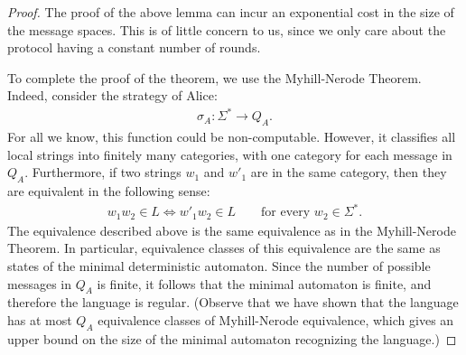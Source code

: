 \begin{proof}
The proof of the above lemma can incur an exponential cost in the size of the message spaces. This is of little concern to us, since we only care about the protocol having a constant number of rounds.

  To complete the proof of the theorem, we use the  Myhill-Nerode Theorem.  Indeed, consider the strategy of  Alice: 
  \begin{align*}
  \sigma_A : \Sigma^* \to Q_A.
  \end{align*}
  For all we know, this function could be non-computable. However, it classifies all local strings into finitely many categories, with one category for each message in $Q_A$. Furthermore, if two strings $w_1$ and $w'_1$ are in the same category, then they are equivalent in the following sense: 
  \begin{align}\label{eq:myhill-nerode-equivalence}
  w_1 w_2 \in L \Leftrightarrow w'_1 w_2 \in L 
  \qquad \text{for every $w_2 \in \Sigma^*$.}
  \end{align}
  The equivalence described above is the same equivalence as in the Myhill-Nerode Theorem. In particular, equivalence classes of this equivalence are the same as states of the minimal deterministic automaton. Since the number of possible messages in $Q_A$ is finite, it follows that the minimal automaton is finite, and therefore the language is regular.  (Observe that we have shown that the language has at most $Q_A$ equivalence classes of Myhill-Nerode equivalence, which gives an upper bound on the size of the minimal automaton recognizing the language.)
\end{proof}


